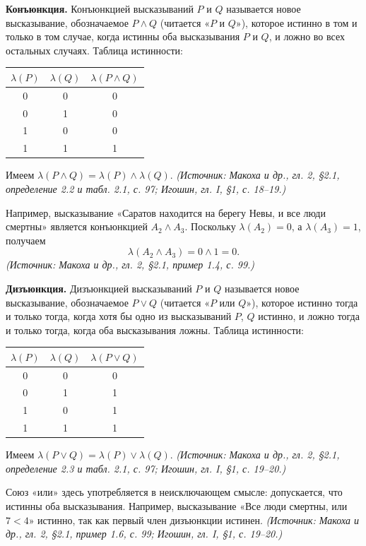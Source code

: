 \documentclass[a4paper,12pt]{article}
\begin{document}
\textbf{Конъюнкция.} Конъюнкцией высказываний \(P\) и \(Q\) называется новое высказывание, обозначаемое \(P\land Q\) (читается «\(P\) и \(Q\)»), которое истинно в том и только в том случае, когда истинны оба высказывания \(P\) и \(Q\), и ложно во всех остальных случаях. Таблица истинности:
\begin{center}
\begin{tabular}{cc|c}
\toprule
\(\lambda(P)\) & \(\lambda(Q)\) & \(\lambda(P\land Q)\)\\
\midrule
0 & 0 & 0\\
0 & 1 & 0\\
1 & 0 & 0\\
1 & 1 & 1\\
\bottomrule
\end{tabular}
\end{center}
Имеем \(\lambda(P\land Q)=\lambda(P)\land\lambda(Q)\).
\textit{(Источник: Макоха и др., гл. 2, §2.1, определение 2.2 и табл. 2.1, с. 97; Игошин, гл. I, §1, с. 18--19.)}

Например, высказывание «Саратов находится на берегу Невы, и все люди смертны» является конъюнкцией \(A_2\land A_3\). Поскольку \(\lambda(A_2)=0\), а \(\lambda(A_3)=1\), получаем
\[
\lambda(A_2\land A_3)=0\land 1=0.
\]
\textit{(Источник: Макоха и др., гл. 2, §2.1, пример 1.4, с. 99.)}

\textbf{Дизъюнкция.} Дизъюнкцией высказываний \(P\) и \(Q\) называется новое высказывание, обозначаемое \(P\lor Q\) (читается «\(P\) или \(Q\)»), которое истинно тогда и только тогда, когда хотя бы одно из высказываний \(P\), \(Q\) истинно, и ложно тогда и только тогда, когда оба высказывания ложны. Таблица истинности:
\begin{center}
\begin{tabular}{cc|c}
\toprule
\(\lambda(P)\) & \(\lambda(Q)\) & \(\lambda(P\lor Q)\)\\
\midrule
0 & 0 & 0\\
0 & 1 & 1\\
1 & 0 & 1\\
1 & 1 & 1\\
\bottomrule
\end{tabular}
\end{center}
Имеем \(\lambda(P\lor Q)=\lambda(P)\lor\lambda(Q)\).
\textit{(Источник: Макоха и др., гл. 2, §2.1, определение 2.3 и табл. 2.1, с. 97; Игошин, гл. I, §1, с. 19--20.)}

Союз «или» здесь употребляется в неисключающем смысле: допускается, что истинны оба высказывания. Например, высказывание «Все люди смертны, или \(7<4\)» истинно, так как первый член дизъюнкции истинен.
\textit{(Источник: Макоха и др., гл. 2, §2.1, пример 1.6, с. 99; Игошин, гл. I, §1, с. 19--20.)}
\end{document}
